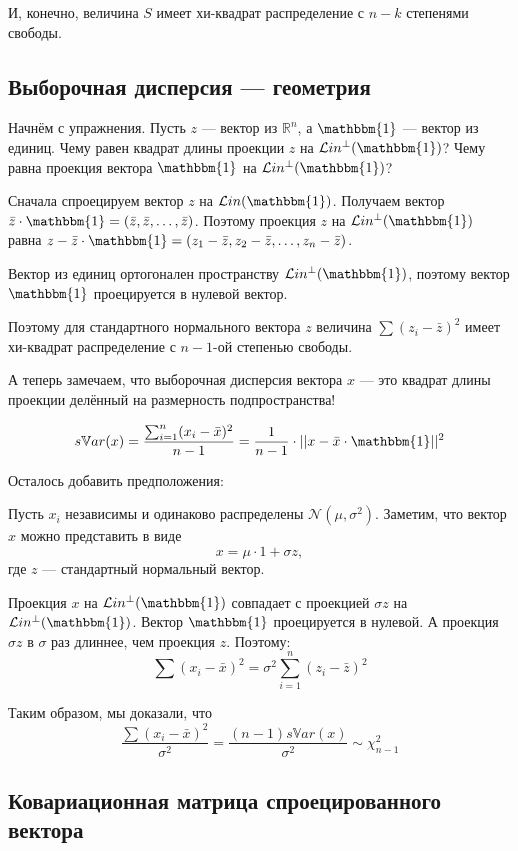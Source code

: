 \documentclass[11pt,russian,]{article}
\newcommand{\cN}{\mathcal{N}}
\newcommand{\RR}{\mathbb{R}}
\renewcommand{\Rn}{\RR^n}
\newcommand{\1}{\mathbbm{1}}
\newcommand{\Lin}{\mathcal{L}in}
\newcommand{\Linp}{\Lin^{\perp}}
\newcommand{\sVar}{s\mathbb{V}ar}
\begin{document}
И, конечно, величина \(S\) имеет хи-квадрат распределение с \(n-k\)
степенями свободы.

\subsection{Выборочная дисперсия --- геометрия}\label{--}

Начнём с упражнения. Пусть \(z\) --- вектор из \(\Rn\), а \(\1\) ---
вектор из единиц. Чему равен квадрат длины проекции \(z\) на
\(\Linp(\1)\)? Чему равна проекция вектора \(\1\) на \(\Linp(\1)\)?

Сначала спроецируем вектор \(z\) на \(\Lin(\1)\). Получаем вектор
\(\bar z \cdot \1 = (\bar z, \bar z, \ldots, \bar z)\). Поэтому проекция
\(z\) на \(\Linp(\1)\) равна
\(z - \bar z \cdot \1 = (z_1 - \bar z, z_2 - \bar z, \ldots, z_n - \bar z)\).

Вектор из единиц ортогонален пространству \(\Linp(\1)\), поэтому вектор
\(\1\) проецируется в нулевой вектор.

Поэтому для стандартного нормального вектора \(z\) величина
\(\sum (z_i - \bar z)^2\) имеет хи-квадрат распределение с \(n-1\)-ой
степенью свободы.

А теперь замечаем, что выборочная дисперсия вектора \(x\) --- это
квадрат длины проекции делённый на размерность подпространства!

\[
\sVar(x) = \frac{\sum_{i=1}^n (x_i - \bar x)^2}{n-1} = \frac{1}{n-1}\cdot ||x - \bar x \cdot \1||^2
\]

Осталось добавить предположения:

Пусть \(x_i\) независимы и одинаково распределены
\(\cN(\mu, \sigma^2)\). Заметим, что вектор \(x\) можно представить в
виде \[
x = \mu \cdot 1 + \sigma z,
\] где \(z\) --- стандартный нормальный вектор.

Проекция \(x\) на \(\Linp(\1)\) совпадает с проекцией \(\sigma z\) на
\(\Linp(\1)\). Вектор \(\1\) проецируется в нулевой. А проекция
\(\sigma z\) в \(\sigma\) раз длиннее, чем проекция \(z\). Поэтому: \[
\sum (x_i - \bar x)^2 = \sigma^2 \sum_{i=1}^n (z_i - \bar z)^2
\]

Таким образом, мы доказали, что \[
\frac{\sum (x_i - \bar x)^2}{\sigma^2} = \frac{(n-1)\sVar(x)}{\sigma^2} \sim \chi^2_{n-1}
\]

\subsection{Ковариационная матрица спроецированного вектора}\label{---}
\end{document}
